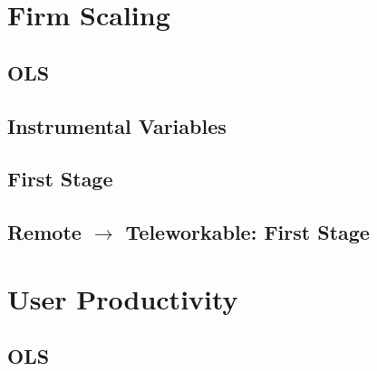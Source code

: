 \documentclass{article}
\newcommand{\cleanedresultsdir}{../results/cleaned}
\begin{document}

\clearpage
\section{Firm Scaling}
\label{sec:firm_scaling}

\subsection{OLS}


\subsection{Instrumental Variables}


\subsection{First Stage}


\subsection{Remote $\rightarrow$ Teleworkable: First Stage}



\clearpage
\section{User Productivity}
\label{sec:user_productivity}

\subsection{OLS}

\end{document}

